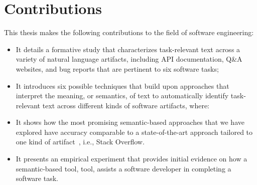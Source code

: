 

\section{Contributions}
\label{cp1:contributions}

This thesis makes the following contributions to the field of software engineering:




\begin{itemize}

    \item It details a formative study that characterizes task-relevant text across a variety of natural language artifacts, including  API documentation, Q\&A websites, and
    bug reports that are pertinent to six software tasks; 

    \item It introduces six possible techniques that build upon approaches that interpret the meaning, or semantics, of text
    to automatically identify task-relevant text across different kinds of software artifacts, where:


    \item It shows how the most promising semantic-based approaches that we have explored have accuracy comparable to a state-of-the-art approach
    tailored to one kind of artifact~\cite{Xu2017}, i.e., Stack Overflow.

    \item It presents an empirical experiment that provides initial evidence on how  
    a semantic-based tool, \acs{tool}, assists a software developer in completing a software task. 
\end{itemize}











